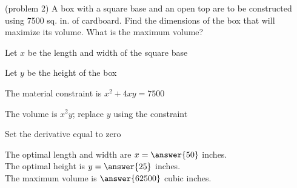 \documentclass[handout]{ximera}
\begin{document}
\begin{problem}(problem 2)
A box with a square base and an open top are to be constructed using 7500 sq. in. of cardboard.  
Find the dimensions of the box that will maximize its volume.  What is the maximum volume?
\begin{hint}
Let $x$ be the length and width of the square base
\end{hint}
\begin{hint}
Let $y$ be the height of the box
\end{hint}
\begin{hint}
The material constraint is $x^2 + 4xy = 7500$
\end{hint}
\begin{hint}
The volume is $x^2 y$; replace $y$ using the constraint
\end{hint}
\begin{hint}
Set the derivative equal to zero
\end{hint}

The optimal length and width are $x = \answer{50}$ inches.\\
The optimal height is $y = \answer{25}$ inches.\\
The maximum volume is $ \answer{62500}$ cubic inches.
\end{problem}
\end{document}
